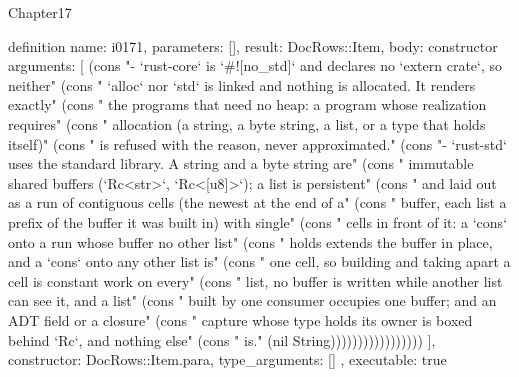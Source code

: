 \begin{lexlean}{Chapter17}
\begin{semanticmodule}
definition{
  name: i0171,
  parameters: [],
  result: DocRows::Item,
  body: constructor{
    arguments: [
      (cons "- `rust-core` is `#![no_std]` and declares no `extern crate`, so neither" (cons "  `alloc` nor `std` is linked and nothing is allocated. It renders exactly" (cons "  the programs that need no heap: a program whose realization requires" (cons "  allocation (a string, a byte string, a list, or a type that holds itself)" (cons "  is refused with the reason, never approximated." (cons "- `rust-std` uses the standard library. A string and a byte string are" (cons "  immutable shared buffers (`Rc<str>`, `Rc<[u8]>`); a list is persistent" (cons "  and laid out as a run of contiguous cells (the newest at the end of a" (cons "  buffer, each list a prefix of the buffer it was built in) with single" (cons "  cells in front of it: a `cons` onto a run whose buffer no other list" (cons "  holds extends the buffer in place, and a `cons` onto any other list is" (cons "  one cell, so building and taking apart a cell is constant work on every" (cons "  list, no buffer is written while another list can see it, and a list" (cons "  built by one consumer occupies one buffer; and an ADT field or a closure" (cons "  capture whose type holds its owner is boxed behind `Rc`, and nothing else" (cons "  is." (nil String)))))))))))))))))
    ],
    constructor: DocRows::Item.para,
    type_arguments: []
  },
  executable: true
}


\end{semanticmodule}
\end{lexlean}
